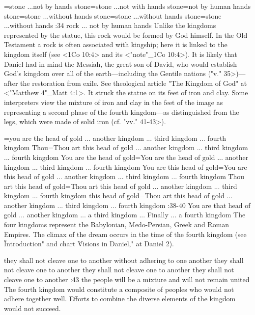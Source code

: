 ={stone ...not by hands} %
    {stone}={stone ...not with hands} %
    {stone}={not by human hands} %
    {stone}={stone ...without hands} %
    {stone}={stone ...without hands} %
    {stone}={stone ...without hands} %
:34 {rock ... not by human hands} Unlike the kingdoms represented by the statue, this rock would be
formed by God himself. In  the Old Testament a rock is often associated with kingship; here it 
is linked to the kingdom itself (see <1Co 10:4> and its <"note"_1Co 10:4>).
It is likely that Daniel had in mind the
Messiah, the great son of David, who  
would establish God's kingdom over all of the earth—including the 
Gentile nations (\<"v." 35>)—after the restoration from exile. See theological article "The Kingdom of
God" at <"Matthew 4"_Matt 4:1>. It struck the  
statue on its feet of iron and clay. Some interpreters view the 
mixture of iron and clay in the feet of the image as representing a
second phase of the fourth kingdom—as distinguished from the 
legs, which were made of solid iron (cf. \<"vv." 41-43>).



={you are the head of gold ... another kingdom ... third kingdom ... fourth kingdom} %
    {Thou}={Thou art this head of gold ... another kingdom ... third kingdom ... fourth kingdom} %
    {You are the head of gold}={You are the head of gold ... another kingdom ... third kingdom ... fourth kingdom} %
    {You are this head of gold}={You are this head of gold ... another kingdom ... third kingdom ... fourth kingdom} %
    {Thou art this head of gold}={Thou art this head of gold ... another kingdom ... third kingdom ... fourth kingdom} %
    {this head of gold}={Thou art this head of gold ... another kingdom ... third kingdom ... fourth kingdom} %
:38-40 {You are that head of gold ... another kingdom ... a third kingdom ... Finally ... a fourth kingdom} 
The four kingdoms represent the Babylonian,
Medo-Persian, Greek and Roman Empires. The climax of the dream occurs in the time of the fourth 
kingdom (see \"Introduction" and chart \"Visions in Daniel," at Daniel 2).

    {they shall not cleave one to another} %
    {without adhering to one another} %
    {they shall not cleave one to another} %
    {they shall not cleave one to another} %
    {they shall not cleave one to another} %
:43 {the people will be a mixture and will not remain united}
The fourth kingdom would constitute a composite of peoples who 
would not adhere together well. Efforts to combine the diverse elements of the kingdom would not
succeed.



